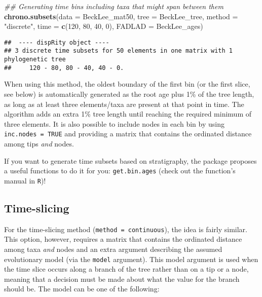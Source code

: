 \documentclass[
]{book}
\newenvironment{Shaded}{\begin{snugshade}}{\end{snugshade}}
\newcommand{\CommentTok}[1]{\textcolor[rgb]{0.56,0.35,0.01}{\textit{#1}}}
\newcommand{\DataTypeTok}[1]{\textcolor[rgb]{0.13,0.29,0.53}{#1}}
\newcommand{\DecValTok}[1]{\textcolor[rgb]{0.00,0.00,0.81}{#1}}
\newcommand{\KeywordTok}[1]{\textcolor[rgb]{0.13,0.29,0.53}{\textbf{#1}}}
\newcommand{\NormalTok}[1]{#1}
\newcommand{\StringTok}[1]{\textcolor[rgb]{0.31,0.60,0.02}{#1}}
\begin{document}
\begin{Shaded}
\begin{Highlighting}[]
\CommentTok{\#\# Generating time bins including taxa that might span between them}
\KeywordTok{chrono.subsets}\NormalTok{(}\DataTypeTok{data =}\NormalTok{ BeckLee\_mat50, }\DataTypeTok{tree =}\NormalTok{ BeckLee\_tree,}
               \DataTypeTok{method =} \StringTok{"discrete"}\NormalTok{,}
               \DataTypeTok{time =} \KeywordTok{c}\NormalTok{(}\DecValTok{120}\NormalTok{, }\DecValTok{80}\NormalTok{, }\DecValTok{40}\NormalTok{, }\DecValTok{0}\NormalTok{), }\DataTypeTok{FADLAD =}\NormalTok{ BeckLee\_ages)}
\end{Highlighting}
\end{Shaded}

\begin{verbatim}
##  ---- dispRity object ---- 
## 3 discrete time subsets for 50 elements in one matrix with 1 phylogenetic tree
##     120 - 80, 80 - 40, 40 - 0.
\end{verbatim}

When using this method, the oldest boundary of the first bin (or the first slice, see below) is automatically generated as the root age plus 1\% of the tree length, as long as at least three elements/taxa are present at that point in time.
The algorithm adds an extra 1\% tree length until reaching the required minimum of three elements.
It is also possible to include nodes in each bin by using \texttt{inc.nodes\ =\ TRUE} and providing a matrix that contains the ordinated distance among tips \emph{and} nodes.

If you want to generate time subsets based on stratigraphy, the package proposes a useful functions to do it for you: \texttt{get.bin.ages} (check out the function's manual in \texttt{R})!

\hypertarget{time-slicing}{%
\subsection{Time-slicing}\label{time-slicing}}

For the time-slicing method (\texttt{method\ =\ continuous}), the idea is fairly similar.
This option, however, requires a matrix that contains the ordinated distance among taxa \emph{and} nodes and an extra argument describing the assumed evolutionary model (via the \texttt{model} argument).
This model argument is used when the time slice occurs along a branch of the tree rather than on a tip or a node, meaning that a decision must be made about what the value for the branch should be.
The model can be one of the following:
\end{document}
